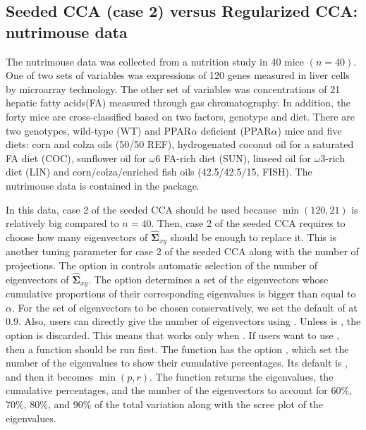 \subsection{Seeded CCA (case 2) versus Regularized CCA: {\sf nutrimouse} data}
The nutrimouse data was collected
from a nutrition study in 40 mice $(n=40)$.
One of two sets of variables was expressions of
120 genes measured in liver cells by microarray technology.
The other set of variables was concentrations of
21 hepatic fatty acids(FA) measured through gas chromatography.
In addition, the forty mice are
cross-classified based on two factors, genotype and diet.
There are two genotypes, wild-type (WT) and
PPAR$\alpha$ deficient (PPAR$\alpha$) mice and five diets: 
corn and colza oils (50/50 REF),
hydrogenated coconut oil for a saturated FA diet (COC),
sunflower oil for $\omega$6 FA-rich diet (SUN),
linseed oil for $\omega$3-rich diet (LIN) and
corn/colza/enriched fish oils (42.5/42.5/15, FISH).
The nutrimouse data is contained in the  package.

In this data, case 2 of the seeded CCA should be used 
because $\min(120,21)$ is relatively big compared to $n=40$.
Then, case 2 of the seeded CCA requires to choose
how many eigenvectors of $\hat{\boldsymbol \Sigma}_{xy}$
should be enough to replace it.
This is another tuning parameter for case 2 of the seeded CCA
along with the number of projections.
The option  in  controls automatic selection
of the number of  eigenvectors of $\hat{\boldsymbol\Sigma}_{xy}$.
The option  determines a set of the eigenvectors
whose cumulative proportions of their corresponding eigenvalues
is bigger than equal to $\alpha$.
For the set of eigenvectors to be chosen conservatively,
we set the default of  at 0.9.
Also, users can directly give the number of eigenvectors
using . Unless  is , the option  is discarded.
This means that  works only when .
If users want to use , then a function  should be run first.
The function  has the option ,
which set the number of the eigenvalues to show their cumulative percentages.
Its default is , and then it becomes $\min(p,r)$.
The function returns the eigenvalues, the cumulative percentages, 
and the number of the eigenvectors to account for 
60\%, 70\%, 80\%, and 90\% of the total variation
along with the scree plot of the eigenvalues.

